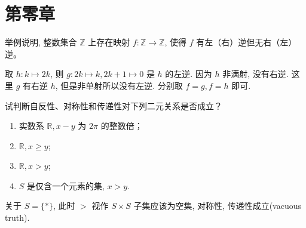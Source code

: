 \section{第零章}

\setcounter{pb}{3}
\begin{problem}
    举例说明, 整数集合 $ \mathbb{Z} $ 上存在映射 
    $ f\colon \mathbb{Z} \to \mathbb{Z} $, 使得 $ f $ 有左（右）逆但无右（左）逆。
\end{problem}

\begin{solution}
    取 $h\colon k \mapsto 2k$, 则 $g\colon 2k\mapsto k, 2k+1\mapsto 0$ 是 $h$ 的左逆. 
    因为 $h$ 非满射, 没有右逆. 这里 $g$ 有右逆 $h$, 但是非单射所以没有左逆. 分别取 $f=g, f=h$ 即可. 
\end{solution}

\begin{problem}
    试判断自反性、对称性和传递性对下列二元关系是否成立？
    \begin{enumerate}[label=(\roman*)]
        \item 实数系 $\mathbb{ R}, x - y $ 为 $ 2\pi $ 的整数倍；
        \item $\mathbb{ R}, x \geq y $;
        \item $\mathbb{ R}, x > y $;
        \item $ S $ 是仅含一个元素的集, $ x > y $. 
    \end{enumerate}
\end{problem}

\begin{solution}
    关于 $S=\{\ast\}$, 此时 $>$ 视作 $S\times S$ 子集应该为空集, 对称性, 传递性成立(vacuous truth).
        \begin{table}[htbp]
            \caption{问题~}
        \end{table}

\end{solution}

